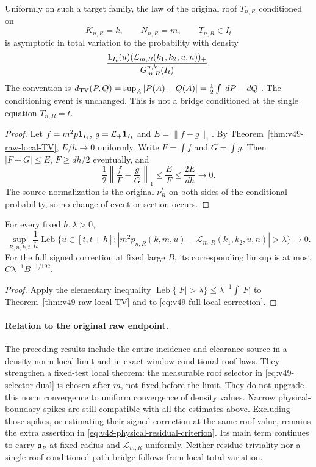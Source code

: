 \begin{corollary}
\label{cor:v49-conditional-roof-TV}
Uniformly on such a target family, the law of the original roof
$T_{n,R}$ conditioned on
\[
 K_{n,R}=k,\qquad N_{n,R}=m,\qquad T_{n,R}\in I_t
\]
is asymptotic in total variation to the probability with density
\begin{equation}\label{eq:v49-conditional-roof-reference}
 \frac{\one_{I_t}(u)
      (\mathcal L_{m,R}(k_1,k_2,u,n))_+}
             {G_{m,R}^{n,k}(I_t)}.
\end{equation}
The convention is
$d_{\operatorname{TV}}(P,Q)=\sup_A|P(A)-Q(A)|=\tfrac12\int|dP-dQ|$.
The conditioning event is unchanged. This is not a bridge conditioned
at the single equation $T_{n,R}=t$.
\end{corollary}
\begin{proof}
Let $f=m^2p\mathbf1_{I_t}$, $g=\mathcal L_+\mathbf1_{I_t}$ and
$E=\|f-g\|_1$. By Theorem~\ref{thm:v49-raw-local-TV},
$E/h\to0$ uniformly. Write $F=\int f$ and $G=\int g$.
Then $|F-G|\le E$, $F\ge dh/2$ eventually, and
\[
 \frac12\left\|\frac fF-\frac gG\right\|_1
                        \le \frac E F\le\frac{2E}{dh}\longrightarrow0.
\]
The source normalization is the original $\nu_R^*$ on both sides of
the conditional probability, so no change of event or section occurs.
\end{proof}

\begin{corollary}
\label{cor:v49-exceptional-roofs}
For every fixed $h,\lambda>0$,
\[
 \sup_{R,n,k,t}\frac1h\operatorname{Leb}
 \{u\in[t,t+h]:|m^2p_{n,R}(k,m,u)
           -\mathcal L_{m,R}(k_1,k_2,u,n)|>\lambda\}\longrightarrow0.
\]
For the full signed correction at fixed large $B$, its corresponding
limsup is at most $C\lambda^{-1}B^{-1/192}$.
\end{corollary}
\begin{proof}
Apply the elementary inequality
$\operatorname{Leb}\{|F|>\lambda\}\le\lambda^{-1}\int|F|$
to Theorem~\ref{thm:v49-raw-local-TV} and to
\eqref{eq:v49-full-local-correction}.
\end{proof}

\paragraph{Relation to the original raw endpoint.}
The preceding results include the entire incidence and clearance
source in a density-norm local limit and in exact-window conditional
roof laws. They strengthen a fixed-test local theorem: the measurable
roof selector in \eqref{eq:v49-selector-dual} is chosen after $m$,
not fixed before the limit. They do not upgrade this norm convergence
to uniform convergence of density values. Narrow physical-boundary
spikes are still compatible with all the estimates above. Excluding
those spikes, or estimating their signed correction at the same roof
value, remains the extra assertion in
\eqref{eq:v48-physical-residual-criterion}. Its main term continues
to carry $\mathfrak a_R$ at fixed radius and $\mathcal L_{m,R}$
uniformly. Neither residue triviality nor a single-roof conditioned
path bridge follows from local total variation.
